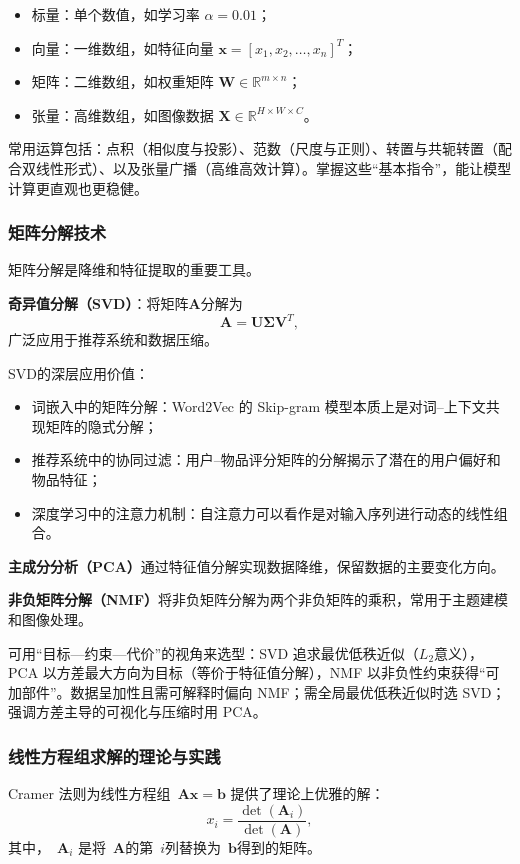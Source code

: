 \begin{itemize}
\begin{itemize}
  \item 标量：单个数值，如学习率 $\alpha = 0.01$；
  \item 向量：一维数组，如特征向量 $\mathbf{x} = [x_1, x_2, \ldots, x_n]^T$；
  \item 矩阵：二维数组，如权重矩阵 $\mathbf{W} \in \mathbb{R}^{m \times n}$；
  \item 张量：高维数组，如图像数据 $\mathbf{X} \in \mathbb{R}^{H \times W \times C}$。
\end{itemize}

常用运算包括：点积（相似度与投影）、范数（尺度与正则）、转置与共轭转置（配合双线性形式）、以及张量广播（高维高效计算）。掌握这些“基本指令”，能让模型计算更直观也更稳健。

\subsubsection{矩阵分解技术}
矩阵分解是降维和特征提取的重要工具。

\textbf{奇异值分解（SVD）}：将矩阵$\mathbf{A}$分解为
$$
\mathbf{A} = \mathbf{U}\mathbf{\Sigma}\mathbf{V}^T,
$$
广泛应用于推荐系统和数据压缩。

SVD的深层应用价值：
\begin{itemize}
  \item 词嵌入中的矩阵分解：Word2Vec 的 Skip-gram 模型本质上是对词–上下文共现矩阵的隐式分解；
  \item 推荐系统中的协同过滤：用户–物品评分矩阵的分解揭示了潜在的用户偏好和物品特征；
  \item 深度学习中的注意力机制：自注意力可以看作是对输入序列进行动态的线性组合。
\end{itemize}

\textbf{主成分分析（PCA）}通过特征值分解实现数据降维，保留数据的主要变化方向。

\textbf{非负矩阵分解（NMF）}将非负矩阵分解为两个非负矩阵的乘积，常用于主题建模和图像处理。

可用“目标—约束—代价”的视角来选型：SVD 追求最优低秩近似（$L_2$意义），PCA 以方差最大方向为目标（等价于特征值分解），NMF 以非负性约束获得“可加部件”。数据呈加性且需可解释时偏向 NMF；需全局最优低秩近似时选 SVD；强调方差主导的可视化与压缩时用 PCA。

\subsubsection{线性方程组求解的理论与实践}

Cramer 法则为线性方程组~$\mathbf{A}\mathbf{x} = \mathbf{b}$ 提供了理论上优雅的解：
$$x_i = \frac{\det(\mathbf{A}_i)}{\det(\mathbf{A})}, $$
其中，~$\mathbf{A}_i$ 是将~$\mathbf{A}$的第~$i$列替换为~$\mathbf{b}$得到的矩阵。


\end{itemize}
